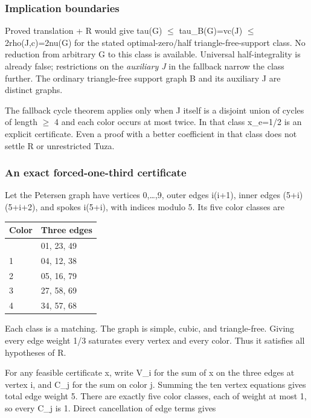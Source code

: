 \documentclass[11pt]{article}
\begin{document}
\subsubsection{Implication boundaries}\label{implication-boundaries}

Proved translation + R would give tau(G) \(\le\) tau\_B(G)=vc(J) \(\le\) 2rho(J,c)=2nu(G) for the stated optimal-zero/half triangle-free-support class. No reduction from arbitrary G to this class is available. Universal half-integrality is already false; restrictions on the \emph{auxiliary J} in the fallback narrow the class further. The ordinary triangle-free support graph B and its auxiliary J are distinct graphs.

The fallback cycle theorem applies only when J itself is a disjoint union of cycles of length \(\ge\) 4 and each color occurs at most twice. In that class x\_e=1/2 is an explicit certificate. Even a proof with a better coefficient in that class does not settle R or unrestricted Tuza.

\subsubsection{An exact forced-one-third certificate}\label{an-exact-forced-one-third-certificate}

Let the Petersen graph have vertices 0,\ldots,9, outer edges i(i+1), inner edges (5+i)(5+i+2), and spokes i(5+i), with indices modulo 5. Its five color classes are

{\def\LTcaptype{none} %
\begin{longtable}[]{@{}ll@{}}
\toprule\noalign{}
Color & Three edges \\
\midrule\noalign{}
\endhead
\bottomrule\noalign{}
\endlastfoot
0 & 01, 23, 49 \\
1 & 04, 12, 38 \\
2 & 05, 16, 79 \\
3 & 27, 58, 69 \\
4 & 34, 57, 68 \\
\end{longtable}
}

Each class is a matching. The graph is simple, cubic, and triangle-free. Giving every edge weight 1/3 saturates every vertex and every color. Thus it satisfies all hypotheses of R.

For any feasible certificate x, write V\_i for the sum of x on the three edges at vertex i, and C\_j for the sum on color j. Summing the ten vertex equations gives total edge weight 5. There are exactly five color classes, each of weight at most 1, so every C\_j is 1. Direct cancellation of edge terms gives
\end{document}

